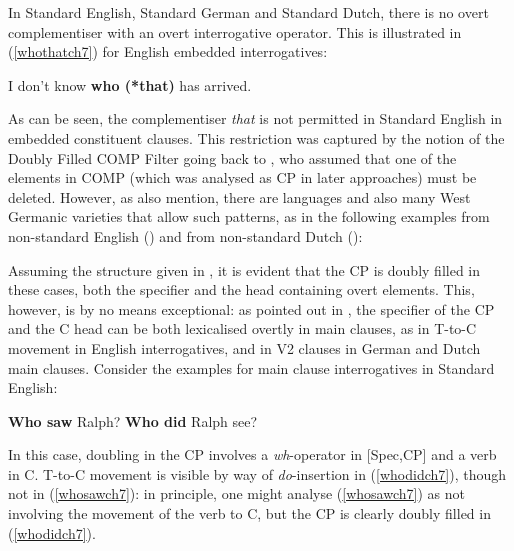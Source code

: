 In Standard English, Standard German and Standard Dutch, there is no overt complementiser with an overt interrogative operator. This is illustrated in (\ref{whothatch7}) for English embedded interrogatives:

\ea	I don't know \textbf{who (*that)} has arrived. \label{whothatch7}
\z

As can be seen, the complementiser \textit{that} is not permitted in Standard English in embedded constituent clauses. This restriction was captured by the notion of the Doubly Filled COMP Filter going back to \citet{chomskylasnik1977}, who assumed that one of the elements in COMP (which was analysed as CP in later approaches) must be deleted. However, as \citet{chomskylasnik1977} also mention, there are languages and also many West Germanic varieties that allow such patterns, as in the following examples from non-standard English (\citealt[331, ex. 1]{baltin2010}) and from non-standard Dutch (\citealt[32]{bacskaiatkaribaudisch2018}):

\ea \label{dfcintch7}
\z
\z

Assuming the structure given in , it is evident that the CP is doubly filled in these cases, both the specifier and the head containing overt elements. This, however, is by no means exceptional: as pointed out in , the specifier of the CP and the C head can be both lexicalised overtly in main clauses, as in T-to-C movement in English interrogatives, and in V2 clauses in German and Dutch main clauses. Consider the examples for main clause interrogatives in Standard English:

\ea \label{ttocch7}
\ea	\textbf{Who saw} Ralph? \label{whosawch7}
\ex	\textbf{Who did} Ralph see? \label{whodidch7}
\z
\z

In this case, doubling in the CP involves a \textit{wh}-operator in [Spec,CP] and a verb in C. T-to-C movement is visible by way of \textit{do}-insertion in (\ref{whodidch7}), though not in (\ref{whosawch7}): in principle, one might analyse (\ref{whosawch7}) as not involving the movement of the verb to C, but the CP is clearly doubly filled in (\ref{whodidch7}).

